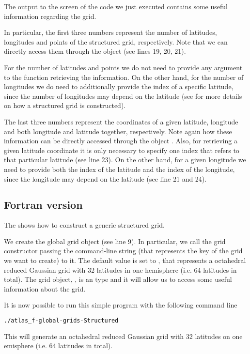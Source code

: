 The output to the screen of the code we just executed 
contains some useful information regarding the grid. 

In particular, the first three numbers represent the 
number of latitudes, longitudes and points of the structured
grid, respectively. Note that we can directly access them 
through the  object (see lines 19, 20, 21).
\begin{tipbox}
For the number of latitudes and points we do not need to provide
any argument to the function retrieving the information. On the 
other hand, for the number of longitudes we do need to additionally 
provide the index of a specific latitude, since the number of 
longitudes may depend on the latitude (see  
for more details on how a structured grid is constructed). 
\end{tipbox}

The last three numbers represent the coordinates of a given 
latitude, longitude and both longitude and latitude together, 
respectively. Note again how these information can be directly 
accessed through the object . 
Also, for retrieving a given latitude coordinate it is only 
necessary to specify one index that refers to that particular 
latitude (see line 23). On the other hand, for a given longitude 
we need to provide both the index of the latitude and the index 
of the longitude, since the longitude may depend on the latitude 
(see line 21 and 24).

\subsection{Fortran version}
The  shows how to construct a generic 
structured grid.

%

%

We create the global 
grid object (see line 9). In particular, we call 
the grid constructor passing the command-line string 
(that represents the key of the grid we want to create) to 
it. The default value is set to , that represents 
a octahedral reduced Gaussian grid with 32 latitudes in one hemisphere 
(i.e. 64 latitudes in total).  
The grid object, , is 
an  type and it will allow 
us to access some useful information about the grid.  

It is now possible to run this simple program with the following command line 
%
\begin{lstlisting}[style=BashStyle]
./atlas_f-global-grids-Structured
\end{lstlisting}
% 
This will generate an octahedral reduced Gaussian grid 
with 32 latitudes on one emisphere (i.e. 64 latitudes 
in total).

